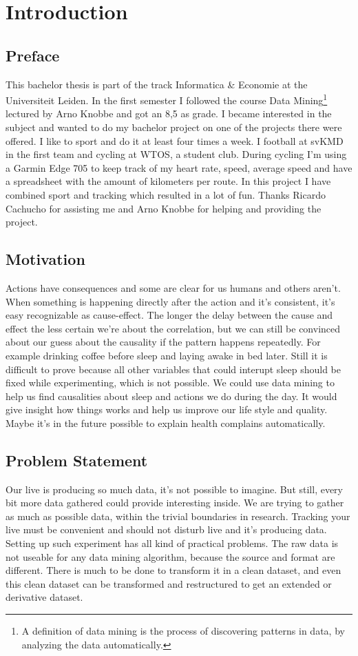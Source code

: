 \section{Introduction}
	\subsection{Preface}
		This bachelor thesis is part of the track Informatica \& Economie at the Universiteit Leiden. In the first semester I followed the course Data Mining\footnote{A definition of data mining is the process of discovering patterns in data, by analyzing the data automatically\cite{datamining}.} lectured by Arno Knobbe and got an 8,5 as grade. I became interested in the subject and wanted to do my bachelor project on one of the projects there were offered. I like to sport and do it at least four times a week. I football at svKMD in the first team and cycling at WTOS, a student club. During cycling I'm using a Garmin Edge 705 to keep track of my heart rate, speed, average speed and have a spreadsheet with the amount of kilometers per route. In this project I have combined sport and tracking which resulted in a lot of fun. Thanks Ricardo Cachucho for assisting me and Arno Knobbe for helping and providing the project.

	\subsection{Motivation}
		Actions have consequences and some are clear for us humans and others aren't. When something is happening directly after the action and it's consistent, it's easy recognizable as cause-effect. The longer the delay between the cause and effect the less certain we're about the correlation, but we can still be convinced about our guess about the causality if the pattern happens repeatedly. For example drinking coffee before sleep and laying awake in bed later. Still it is difficult to prove because all other variables that could interupt sleep should be fixed while experimenting, which is not possible. We could use data mining to help us find causalities about sleep and actions we do during the day. It would give insight how things works and help us improve our life style and quality. Maybe it's in the future possible to explain health complains automatically.

	\subsection{Problem Statement}
		Our live is producing so much data, it's not possible to imagine. But still, every bit more data gathered could provide interesting inside. We are trying to gather as much as possible data, within the trivial boundaries in research. Tracking your live must be convenient and should not disturb live and it's producing data. Setting up such experiment has all kind of practical problems. The raw data is not useable for any data mining algorithm, because the source and format are different. There is much to be done to transform it in a clean dataset, and even this clean dataset can be transformed and restructured to get an extended or derivative dataset. 

